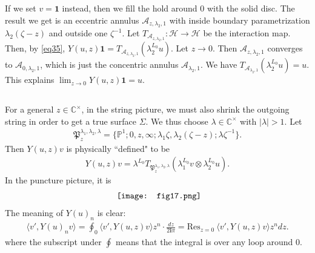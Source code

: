\documentclass[12pt,a4paper,notitlepage]{article}
\theoremstyle{definition}
\theoremstyle{plain}
\newcommand{\fk}{\mathfrak}
\newcommand{\mc}{\mathcal}
\newcommand{\id}{\mathbf{1}}
\newcommand{\Res}{\mathrm{Res}}
\newcommand{\bk}[1]{\langle {#1}\rangle}
\newcommand{\im}{\mathbf{i}}
\newcommand{\Cbb}{\mathbb C}
\newcommand{\Pbb}{\mathbb P}
\numberwithin{equation}{section}
\begin{document}
If we set $v=\id$ instead, then we fill the hold around $0$ with the solid disc. The result we get is an eccentric annulus $\mc A_{z,\lambda_2,1}$ with inside boundary parametrization $\lambda_2(\zeta-z)$ and outside one $\zeta^{-1}$. Let $T_{\mc A_{z,\lambda_2,1}}:\mc H\rightarrow\mc H$ be the interaction map. Then, by \eqref{eq35}, $Y(u,z)\id=T_{\mc A_{z,\lambda_2,1}}(\lambda_2^{L_0}u)$. Let $z\rightarrow 0$. Then $\mc A_{z,\lambda_2,1}$ converges to $\mc A_{0,\lambda_2,1}$, which is just the concentric annulus $\mc A_{\lambda_2,1}$. We have $T_{\mc A_{\lambda_2,1}}(\lambda_2^{L_0}u)=u$. This explains $\lim_{z\rightarrow 0} Y(u,z)\id=u$.











\subsection{}


For a general $z\in\Cbb^\times$, in the string picture, we must also shrink the outgoing string in order to get a true surface $\Sigma$. We thus choose $\lambda\in\Cbb^\times$ with $|\lambda|>1$. Let
\begin{align*}
\fk P_z^{\lambda_1,\lambda_2,\lambda}=\{\Pbb^1;0,z,\infty;\lambda_1\zeta,\lambda_2(\zeta-z);\lambda\zeta^{-1}\}.	
\end{align*}
Then $Y(u,z)v$ is physically ``defined" to be
\begin{align}
Y(u,z)v=\lambda^{L_0}T_{\fk P_z^{\lambda_1,\lambda_2,\lambda}}(\lambda_1^{L_0}v\otimes\lambda_2^{L_0}u).	
\end{align}
In the puncture picture, it is
\begin{align*}
	\vcenter{\hbox{{
				\texttt{[image: fig17.png]}}}}	
\end{align*}
The meaning of $Y(u)_n$ is clear:
\begin{align*}
\bk{v',Y(u)_n v}=\oint_0 \bk{v',Y(u,z)v} z^n\cdot\frac{dz}{2\im\pi}=\Res_{z=0}~	\bk{v',Y(u,z)v} z^ndz.
\end{align*}
where the subscript under $\oint$ means that the integral is over any loop around $0$.

\subsection{}
\end{document}
